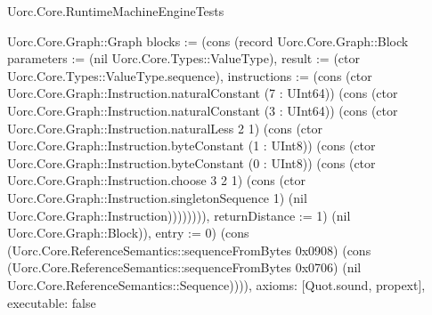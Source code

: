 \begin{lexlean}{Uorc.Core.RuntimeMachineEngineTests}
\begin{semanticmodule}
{Uorc.Core.Graph::Graph {blocks := (cons (record Uorc.Core.Graph::Block {parameters := (nil Uorc.Core.Types::ValueType), result := (ctor Uorc.Core.Types::ValueType.sequence), instructions := (cons (ctor Uorc.Core.Graph::Instruction.naturalConstant (7 : UInt64)) (cons (ctor Uorc.Core.Graph::Instruction.naturalConstant (3 : UInt64)) (cons (ctor Uorc.Core.Graph::Instruction.naturalLess 2 1) (cons (ctor Uorc.Core.Graph::Instruction.byteConstant (1 : UInt8)) (cons (ctor Uorc.Core.Graph::Instruction.byteConstant (0 : UInt8)) (cons (ctor Uorc.Core.Graph::Instruction.choose 3 2 1) (cons (ctor Uorc.Core.Graph::Instruction.singletonSequence 1) (nil Uorc.Core.Graph::Instruction)))))))), returnDistance := 1}) (nil Uorc.Core.Graph::Block)), entry := 0}) (cons (Uorc.Core.ReferenceSemantics::sequenceFromBytes 0x0908) (cons (Uorc.Core.ReferenceSemantics::sequenceFromBytes 0x0706) (nil Uorc.Core.ReferenceSemantics::Sequence)))),
  axioms: [Quot.sound, propext],
  executable: false
}


\end{semanticmodule}
\end{lexlean}
